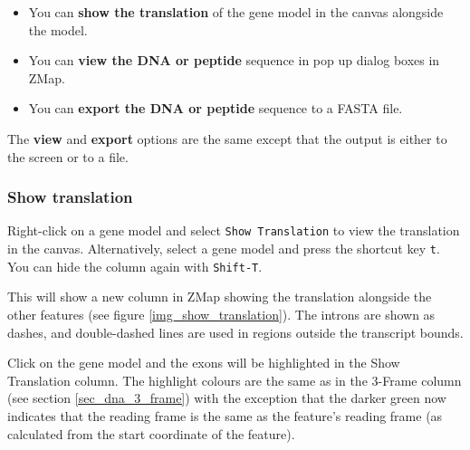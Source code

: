 \documentclass[letterpaper]{article}
\begin{document}
\begin{itemize}
\item You can \textbf{show the translation} of the gene model in the canvas alongside the model.
\item You can \textbf{view the DNA or peptide} sequence in pop up dialog boxes in ZMap.
\item You can \textbf{export the DNA or peptide} sequence to a FASTA file.
\end{itemize}

The \textbf{view} and \textbf{export} options are the same except that the output is either to the screen or to a file.

\subsubsection{Show translation} \label{sec_show_translation}
Right-click on a gene model and select \lstinline{Show Translation} to view the translation in the canvas. Alternatively, select a gene model and press the shortcut key \lstinline{t}. You can hide the column again with \lstinline{Shift-T}.

This will show a new column in ZMap showing the translation alongside the other features (see figure \ref{img_show_translation}). The introns are shown as dashes, and double-dashed lines are used in regions outside the transcript bounds.

Click on the gene model and the exons will be highlighted in the Show Translation column. The highlight colours are the same as in the 3-Frame column (see section \ref{sec_dna_3_frame}) with the exception that the darker green now indicates that the reading frame is the same as the feature's reading frame (as calculated from the start coordinate of the feature).
\end{document}

